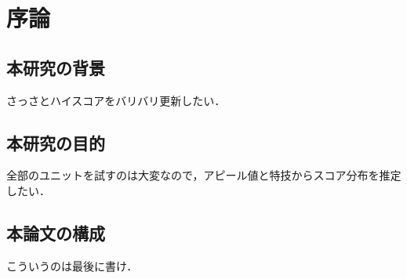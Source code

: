 \section{序論}

\subsection{本研究の背景}
さっさとハイスコアをバリバリ更新したい．

\subsection{本研究の目的}
全部のユニットを試すのは大変なので，アピール値と特技からスコア分布を推定したい．

\subsection{本論文の構成}
こういうのは最後に書け．
